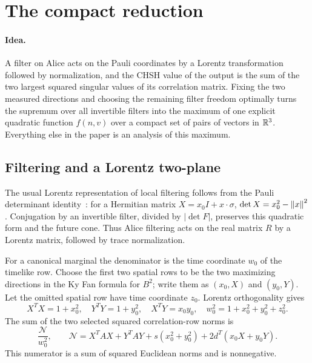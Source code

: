 \section{The compact reduction}
\label{sec:compact}

\paragraph{Idea.} A filter on Alice acts on the Pauli coordinates by a Lorentz transformation followed by normalization, and the CHSH value of the output is the sum of the two largest squared singular values of its correlation matrix. Fixing the two measured directions and choosing the remaining filter freedom optimally turns the supremum over all invertible filters into the maximum of one explicit quadratic function $f(n,v)$ over a compact set of pairs of vectors in $\mathbb R^3$. Everything else in the paper is an analysis of this maximum.

\subsection{Filtering and a Lorentz two-plane}

The usual Lorentz representation of local filtering follows from the Pauli determinant identity~\cite{verstraete}: for a Hermitian matrix $X=x_0I+x\cdot\sigma$,
$\det X=x_0^2-\left\lVert x\right\rVert^2$. Conjugation by an invertible filter, divided by $|\det F|$, preserves this quadratic form and the future cone. Thus Alice filtering acts on the real matrix $R$ by a Lorentz matrix, followed by trace normalization.

For a canonical marginal the denominator is the time coordinate $w_0$ of the timelike row. Choose the first two spatial rows to be the two maximizing directions in the Ky Fan formula for $B^2$; write them as $(x_0,X)$ and $(y_0,Y)$. Let the omitted spatial row have time coordinate $z_0$. Lorentz orthogonality gives
\begin{equation}
 X^TX=1+x_0^2,\quad Y^TY=1+y_0^2,\quad X^TY=x_0y_0,
 \quad w_0^2=1+x_0^2+y_0^2+z_0^2.
 \label{eq:lorentzrows}
\end{equation}
The sum of the two selected squared correlation-row norms is
\begin{equation}
 \frac{\mathcal N}{w_0^2},\qquad
 \mathcal N=X^TAX+Y^TAY+s(x_0^2+y_0^2)
 +2d^T(x_0X+y_0Y).
\end{equation}
This numerator is a sum of squared Euclidean norms and is nonnegative.

